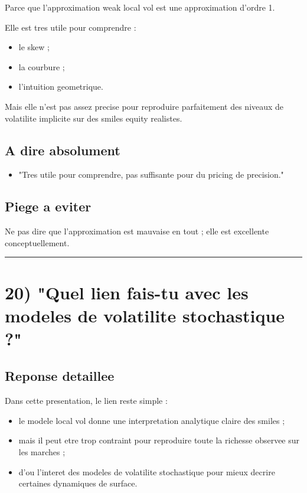 \documentclass[11pt,a4paper]{article}
\begin{document}
Parce que l'approximation weak local vol est une approximation d'ordre 1.

Elle est tres utile pour comprendre :

\begin{itemize}
\item le skew ;
\item la courbure ;
\item l'intuition geometrique.
\end{itemize}

Mais elle n'est pas assez precise pour reproduire parfaitement des niveaux de volatilite implicite sur des smiles equity realistes.

\subsection{A dire absolument}

\begin{itemize}
\item "Tres utile pour comprendre, pas suffisante pour du pricing de precision."
\end{itemize}

\subsection{Piege a eviter}

Ne pas dire que l'approximation est mauvaise en tout ; elle est excellente conceptuellement.

\bigskip\hrule\bigskip

\section{20) "Quel lien fais-tu avec les modeles de volatilite stochastique ?"}

\subsection{Reponse detaillee}

Dans cette presentation, le lien reste simple :

\begin{itemize}
\item le modele local vol donne une interpretation analytique claire des smiles ;
\item mais il peut etre trop contraint pour reproduire toute la richesse observee sur les marches ;
\item d'ou l'interet des modeles de volatilite stochastique pour mieux decrire certaines dynamiques de surface.
\end{itemize}
\end{document}
